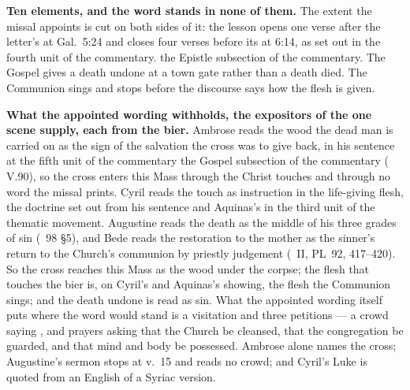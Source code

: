 \textbf{Ten elements, and the word stands in none of them.} The extent the missal
appoints is cut on both sides of it: the lesson opens one verse after the
letter's  at Gal.\ 5:24 and closes four verses before its
 at 6:14, as set out in
\ifdefined\TriptychSynthesisEdition
the fourth unit of the commentary.%
\else
the Epistle subsection of the commentary.%
\fi{}
The Gospel gives a death undone at a town gate rather than a death died. The
Communion sings  and stops before the
discourse says how the flesh is given.

\textbf{What the appointed wording withholds, the expositors of the one scene
supply, each from the bier.} Ambrose reads the wood the dead man is carried on
as the sign of the salvation the cross was to give back, in his sentence at
\ifdefined\TriptychSynthesisEdition
the fifth unit of the commentary%
\else
the Gospel subsection of the commentary%
\fi{} ( V.90), so the
cross enters this Mass through the  Christ touches and through no
word the missal prints. Cyril reads the touch as instruction in the life-giving
flesh, the doctrine set out from his sentence and Aquinas's in the third unit of
the thematic movement. Augustine reads the death as the middle of his three
grades of sin (~98 §5), and Bede reads the restoration to the mother
as the sinner's return to the Church's communion by priestly judgement
(~II, PL~92, 417--420).
So the cross reaches this Mass as the wood under the corpse; the flesh that
touches the bier is, on Cyril's and Aquinas's showing, the flesh the Communion
sings; and the death undone is read as sin. What the appointed wording itself
puts where the word would stand is a visitation and three petitions --- a crowd
saying , and prayers asking that the Church be
cleansed, that the congregation be guarded, and that mind and body be possessed.
Ambrose alone names the cross; Augustine's sermon stops at v.~15 and reads no
crowd; and Cyril's Luke is quoted from an English of a Syriac version.
